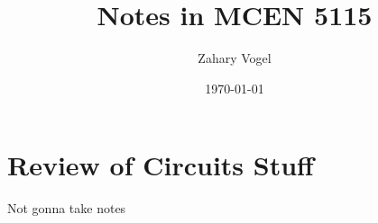 \documentclass{article}
\author{Zahary Vogel}
\date{\today}
\title{Notes in MCEN 5115}
\begin{document}
\maketitle


\section*{Review of Circuits Stuff}
Not gonna take notes
\end{document}
